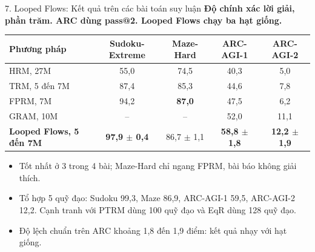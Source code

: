 \begin{frame}{7. Looped Flows: Kết quả trên các bài toán suy luận}
    \textbf{Độ chính xác lời giải, phần trăm. ARC dùng pass@2. Looped Flows chạy ba hạt giống.}
    \begin{table}[h]
        \centering
        \small
        \begin{tabular}{lcccc}
            \toprule
            \textbf{Phương pháp} & \textbf{Sudoku-Extreme} & \textbf{Maze-Hard} & \textbf{ARC-AGI-1} & \textbf{ARC-AGI-2} \\
            \midrule
            HRM, 27M & 55,0 & 74,5 & 40,3 & 5,0 \\
            TRM, 5 đến 7M & 87,4 & 85,3 & 44,6 & 7,8 \\
            FPRM, 7M & 94,2 & \textbf{87,0} & 47,5 & 6,2 \\
            GRAM, 10M & -- & -- & 52,0 & 11,1 \\
            \midrule
            \textbf{Looped Flows, 5 đến 7M} & \textbf{97,9 $\pm$ 0,4} & 86,7 $\pm$ 1,1 & \textbf{58,8 $\pm$ 1,8} & \textbf{12,2 $\pm$ 1,9} \\
            \bottomrule
        \end{tabular}
    \end{table}
    \vspace{-0.2cm}
    \begin{small}
    \begin{itemize}
        \item Tốt nhất ở 3 trong 4 bài; Maze-Hard chỉ ngang FPRM, bài báo không giải thích.
        \item Tổ hợp 5 quỹ đạo: Sudoku 99,3, Maze 86,9, ARC-AGI-1 59,5, ARC-AGI-2 12,2. Cạnh tranh với PTRM dùng 100 quỹ đạo và EqR dùng 128 quỹ đạo.
        \item Độ lệch chuẩn trên ARC khoảng 1,8 đến 1,9 điểm: kết quả nhạy với hạt giống.
    \end{itemize}
    \end{small}
\end{frame}

